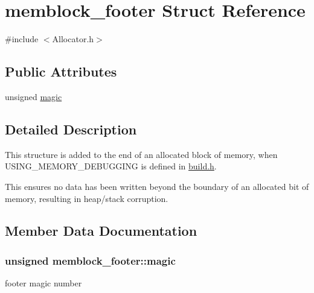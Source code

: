 \section{memblock\-\_\-footer Struct Reference}
\label{structmemblock__footer}


{\ttfamily \#include $<$Allocator.\-h$>$}

\subsection*{Public Attributes}
\begin{DoxyCompactItemize}
\item 
unsigned \hyperlink{structmemblock__footer_adbe248bf9ad8f03cdc7c202140989da9}{magic}
\end{DoxyCompactItemize}


\subsection{Detailed Description}
This structure is added to the end of an allocated block of memory, when U\-S\-I\-N\-G\-\_\-\-M\-E\-M\-O\-R\-Y\-\_\-\-D\-E\-B\-U\-G\-G\-I\-N\-G is defined in \hyperlink{build_8h}{build.\-h}.

This ensures no data has been written beyond the boundary of an allocated bit of memory, resulting in heap/stack corruption. 

\subsection{Member Data Documentation}
\subsubsection[{magic}]{\setlength{\rightskip}{0pt plus 5cm}unsigned memblock\-\_\-footer\-::magic}\label{structmemblock__footer_adbe248bf9ad8f03cdc7c202140989da9}
footer magic number 